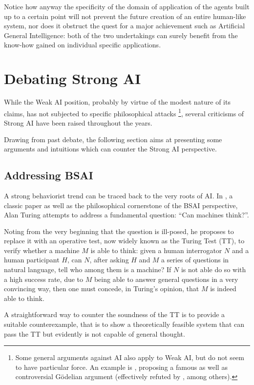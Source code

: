 \documentclass{article}
\begin{document}
Notice how anyway the specificity of the domain of application of the agents built up to a certain point will not prevent the future creation of an entire human-like system, nor does it obstruct the quest for a major achievement such as Artificial General Intelligence: both of the two undertakings can surely benefit from the know-how gained on individual specific applications.

\section{Debating Strong AI}

While the Weak AI position, probably by virtue of the modest nature of its claims, has not subjected to specific philosophical attacks \footnote{Some general arguments against AI also apply to Weak AI, but do not seem to have particular force. An example is \citep{penrose1989emperor}, proposing a famous as well as controversial Gödelian argument (effectively refuted by \citealp{searle1998mystery}, among others).}, several criticisms of Strong AI have been raised throughout the years.

Drawing from past debate, the following section aims at presenting some arguments and intuitions which can counter the Strong AI perspective.

\subsection{Addressing BSAI}

A strong behaviorist trend can be traced back to the very roots of AI. In \citep{alan1950turing}, a classic paper as well as the philosophical cornerstone of the BSAI perspective, Alan Turing attempts to address a fundamental question: ``Can machines think?''.

Noting from the very beginning that the question is ill-posed, he proposes to replace it with an operative test, now widely known as the Turing Test (TT), to verify whether a machine \(M\) is able to think: given a human interrogator \(N\) and a human participant \(H\), can \(N\), after asking \(H\) and \(M\) a series of questions in natural language, tell who among them is a machine? If \(N\) is not able do so with a high success rate, due to \(M\) being able to answer general questions in a very convincing way, then one must concede, in Turing's opinion, that \(M\) is indeed able to think.

A straightforward way to counter the soundness of the TT is to provide a suitable counterexample, that is to show a theoretically feasible system that can pass the TT but evidently is not capable of general thought.
\end{document}
